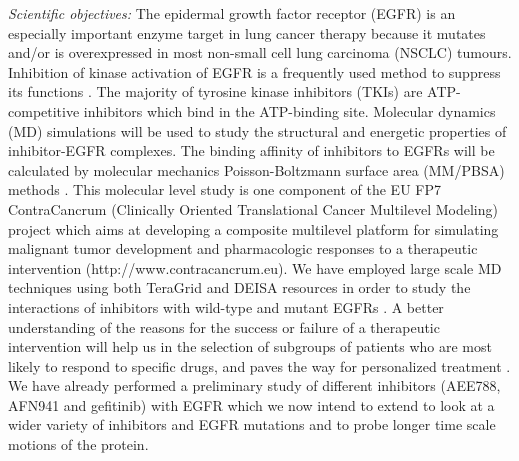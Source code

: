 \emph{Scientific objectives: } The epidermal growth factor receptor (EGFR) is an especially important enzyme target in lung cancer therapy because it mutates and/or is overexpressed in most non-small cell lung carcinoma (NSCLC) tumours. Inhibition of kinase activation of EGFR is a frequently used method to suppress its functions \cite{bib:nature_tki}. The majority of tyrosine kinase inhibitors (TKIs) are ATP-competitive inhibitors which bind in the ATP-binding site. Molecular dynamics (MD) simulations will be used to study the structural and energetic properties of inhibitor-EGFR complexes. The binding affinity of inhibitors to EGFRs will be calculated by molecular mechanics Poisson-Boltzmann surface area (MM/PBSA) methods \cite{bib:wan_philtrans}. This molecular level study is one component of the EU FP7 ContraCancrum (Clinically Oriented Translational Cancer Multilevel Modeling) project which aims at developing a composite multilevel platform for simulating malignant tumor development and pharmacologic responses to a therapeutic intervention (http://www.contracancrum.eu). We have employed large scale MD techniques using both TeraGrid and DEISA resources in order to study the interactions of inhibitors with wild-type and mutant EGFRs \cite{bib:wc2009}. A better understanding of the reasons for the success or failure of a therapeutic intervention will help us in the selection of subgroups of patients who are most likely to respond to specific drugs, and paves the way for personalized treatment \cite{bib:hiv}. We have already performed a preliminary study of different inhibitors (AEE788, AFN941 and gefitinib) with EGFR which we now intend to extend to look at a wider variety of inhibitors and EGFR mutations and to probe longer time scale motions of the protein.


